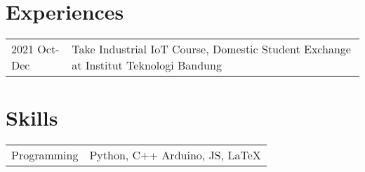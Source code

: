 \documentclass[12pt,letterpaper]{report}
\begin{document}
    \section*{Experiences}
    \begin{tabular}{@{}p{}p{}}
        2021 Oct-Dec & Take Industrial IoT Course, Domestic Student Exchange at Institut Teknologi Bandung
    \end{tabular}

    \section*{Skills}
    \begin{tabular}{@{}p{}p{}}
        Programming & Python, C++ Arduino, JS, \LaTeX \\
    \end{tabular}
\end{document}
